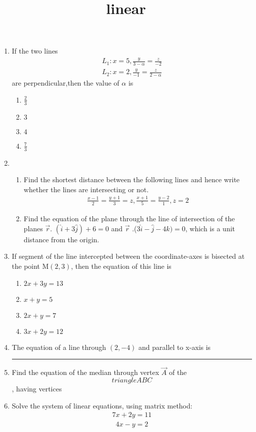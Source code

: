 \documentclass{article}
\title{linear}
\begin{document}
\begin{enumerate}
	\item If the two lines
	\begin{align}	
		L_{1} : x=5, \frac{y}{3-\alpha} = \frac{z}{-2}
	\end{align}
	\begin{align}
		L_{2}: x=2, \frac{y}{-1} = \frac{z}{2-\alpha}
	\end{align}
   	 are perpendicular,then the value of $\alpha$ is
   	\begin{enumerate}%
   		\item $\frac{2}{3}$
		\item $3$
		\item $4$
		\item $\frac{7}{3}$
	\end{enumerate}
	\item \begin{enumerate} %
	\item Find the shortest distance between the following lines and hence write whether the lines are intersecting or not.
	\begin{align}
		\frac{x-1}{2} = \frac{y+1}{3}=z, \frac{x+1}{5} = \frac{y-2}{1}, z=2
	\end{align}
	\item Find the equation of the plane through the line of intersection of the planes $\vec{r}$. $(\hat{i}+3\hat{j}) + 6 = 0$ and $\vec{r}$ .($3\hat{i}-\hat{j}-4\hat{k}) = 0$, which is a unit distance from the origin.
	\end{enumerate}
	\item If segment of the line intercepted between the coordinate-axes is bisected at the point M$(2,3)$, then the equation of this line is
		\begin{enumerate}%
			\item $2x + 3y = 13$
			\item $x+y = 5$
			\item $2x + y = 7$
			\item $3x + 2y = 12$
		\end{enumerate}
	\item The equation of a line through $(2,-4)$ and parallel to x-axis is\rule{1cm}{0.15mm}
	\item Find the equation of the median through vertex $\vec{A}$ of the $$triangle ABC$$, having vertices 
	\item Solve the system of linear equations, using matrix method:
		\begin{align}	
			7x+2y = 11
		\end{align}
		\begin{align}
			4x-y = 2
		\end{align}
\end{enumerate}
\end{document}
